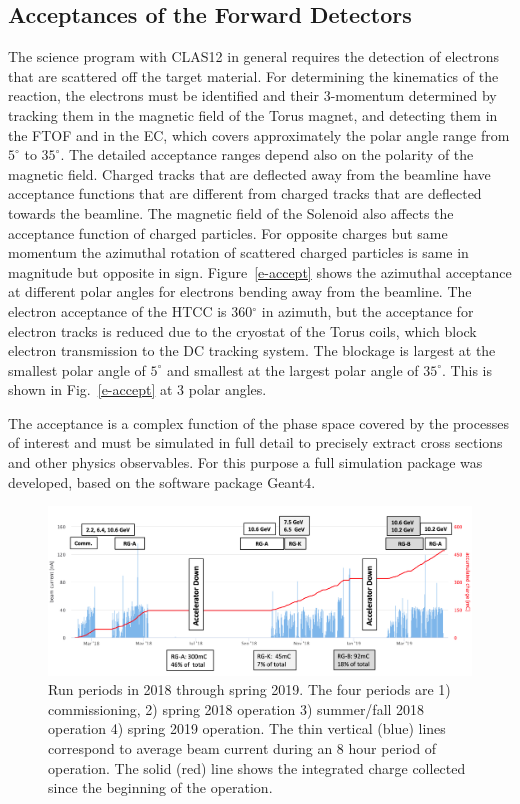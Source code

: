 \documentclass[final,3p,twocolumn]{elsarticle}
\begin{document}
\subsection{Acceptances of the Forward Detectors} 

The science program with CLAS12 in general requires the detection of electrons that are scattered off the target
material. For determining the kinematics of the reaction, the electrons must be identified and their 3-momentum
determined by tracking them in the magnetic field of the Torus magnet, and detecting them in the FTOF and in the
EC, which covers approximately the polar angle range from $5^\circ$ to $35^\circ$. The detailed acceptance ranges
depend also on the polarity of the magnetic field. Charged tracks that are deflected away from the beamline have
acceptance functions that are different from charged tracks that are deflected towards the beamline. The magnetic
field of the Solenoid also affects the acceptance function of charged particles. For opposite charges but same 
momentum the azimuthal rotation of scattered charged particles is same in magnitude but opposite in sign.  
Figure~\ref{e-accept} shows the azimuthal acceptance at different polar angles for electrons bending away from the
beamline. The electron acceptance of the HTCC is 360$^\circ$ in azimuth, but the acceptance for electron tracks is
reduced due to the cryostat of the Torus coils, which block electron transmission to the DC tracking system. The blockage
is largest at the smallest polar angle of $5^\circ$ and smallest at the largest polar angle of  $35^\circ$. This is shown 
in Fig.~\ref{e-accept} at 3 polar angles.  

The acceptance is a complex function of the phase space covered by the processes of interest and must be simulated in 
full detail to precisely extract cross sections and other physics observables.  For this purpose a full simulation package 
was developed, based on the software package Geant4. 

\begin{figure}[htbp!]
\centerline{\includegraphics[width=1.9\columnwidth]{charges-bw.png}}
\caption{Run periods in 2018 through spring 2019. The four periods are 1) commissioning, 2) spring 2018 operation
3) summer/fall 2018 operation 4) spring 2019 operation. The thin vertical (blue) lines correspond to average beam
current during an 8 hour period of operation. The solid (red) line shows the integrated charge collected since the
beginning of the operation.}
\label{charges}
\end{figure}
\end{document}
